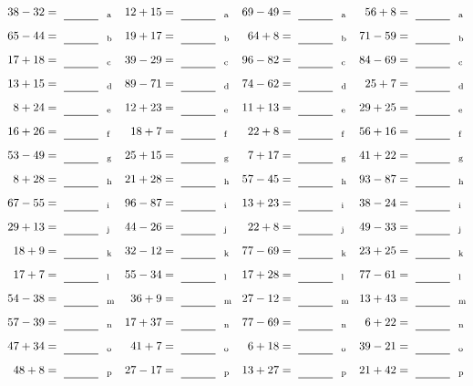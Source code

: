 \documentclass
[
  draft    = true,
  fontsize = 11pt,
  parskip  = half-
]
{scrartcl}
\begin{document}
\clearpage
\begin{align*}
    \pline{38-32}&=\rline{a}
  & \pline{12+15}&=\rline{a}
  & \pline{69-49}&=\rline{a}
  & \pline{56+8}&=\rline{a} \\[1ex]
    \pline{65-44}&=\rline{b}
  & \pline{19+17}&=\rline{b}
  & \pline{64+8}&=\rline{b}
  & \pline{71-59}&=\rline{b} \\[1ex]
    \pline{17+18}&=\rline{c}
  & \pline{39-29}&=\rline{c}
  & \pline{96-82}&=\rline{c}
  & \pline{84-69}&=\rline{c} \\[1ex]
    \pline{13+15}&=\rline{d}
  & \pline{89-71}&=\rline{d}
  & \pline{74-62}&=\rline{d}
  & \pline{25+7}&=\rline{d} \\[1ex]
    \pline{8+24}&=\rline{e}
  & \pline{12+23}&=\rline{e}
  & \pline{11+13}&=\rline{e}
  & \pline{29+25}&=\rline{e} \\[1ex]
    \pline{16+26}&=\rline{f}
  & \pline{18+7}&=\rline{f}
  & \pline{22+8}&=\rline{f}
  & \pline{56+16}&=\rline{f} \\[1ex]
    \pline{53-49}&=\rline{g}
  & \pline{25+15}&=\rline{g}
  & \pline{7+17}&=\rline{g}
  & \pline{41+22}&=\rline{g} \\[1ex]
    \pline{8+28}&=\rline{h}
  & \pline{21+28}&=\rline{h}
  & \pline{57-45}&=\rline{h}
  & \pline{93-87}&=\rline{h} \\[1ex]
    \pline{67-55}&=\rline{i}
  & \pline{96-87}&=\rline{i}
  & \pline{13+23}&=\rline{i}
  & \pline{38-24}&=\rline{i} \\[1ex]
    \pline{29+13}&=\rline{j}
  & \pline{44-26}&=\rline{j}
  & \pline{22+8}&=\rline{j}
  & \pline{49-33}&=\rline{j} \\[1ex]
    \pline{18+9}&=\rline{k}
  & \pline{32-12}&=\rline{k}
  & \pline{77-69}&=\rline{k}
  & \pline{23+25}&=\rline{k} \\[1ex]
    \pline{17+7}&=\rline{l}
  & \pline{55-34}&=\rline{l}
  & \pline{17+28}&=\rline{l}
  & \pline{77-61}&=\rline{l} \\[1ex]
    \pline{54-38}&=\rline{m}
  & \pline{36+9}&=\rline{m}
  & \pline{27-12}&=\rline{m}
  & \pline{13+43}&=\rline{m} \\[1ex]
    \pline{57-39}&=\rline{n}
  & \pline{17+37}&=\rline{n}
  & \pline{77-69}&=\rline{n}
  & \pline{6+22}&=\rline{n} \\[1ex]
    \pline{47+34}&=\rline{o}
  & \pline{41+7}&=\rline{o}
  & \pline{6+18}&=\rline{o}
  & \pline{39-21}&=\rline{o} \\[1ex]
    \pline{48+8}&=\rline{p}
  & \pline{27-17}&=\rline{p}
  & \pline{13+27}&=\rline{p}
  & \pline{21+42}&=\rline{p}
\end{align*}
\end{document}
